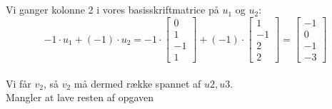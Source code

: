 \documentclass[a4paper,12pt]{article}
\begin{document}
\subsection{}

Vi ganger kolonne 2 i vores basisskriftmatrice på $u_1$ og $u_2$:
\[
-1 \cdot u_1 + (-1)\cdot u_2 =
-1 \cdot
\left[\begin{array}{ccc}
    0\\
    1\\
    -1\\
    1
\end{array}\right]
+
(-1) \cdot
\left[\begin{array}{ccc}
    1\\
    -1\\
    2\\
    2
\end{array}\right]
=
\left[\begin{array}{ccc}
    -1\\
    0\\
    -1\\
    -3
\end{array}\right]
\]\\

Vi får $v_2$, så $v_2$ må dermed række spannet af $u2, u3$.\\

Mangler at lave resten af opgaven

\subsection{}


\subsection{}


\section{}
\subsection{}
\end{document}
